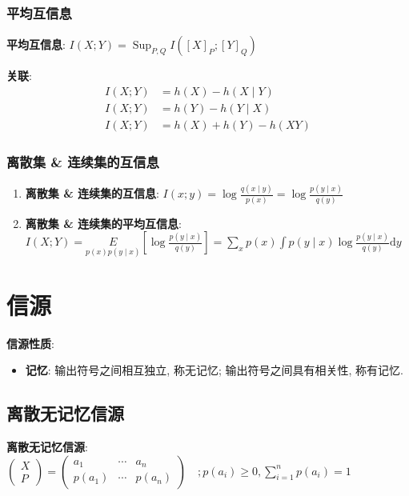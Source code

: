 \documentclass{article}
\begin{document}
        \subsubsection{平均互信息}
            \textbf{平均互信息}: $I(X ; Y)=\operatorname{Sup}_{P, Q} I\left([X]_{P} ;[Y]_{Q}\right)$
            
            \textbf{关联}:
                \begin{align*}
                    I(X ; Y) &= h(X)-h(X \mid Y) \\
                    I(X ; Y) &= h(Y)-h(Y \mid X) \\
                    I(X ; Y) &= h(X)+h(Y)-h(X Y)
                \end{align*}
                
        \subsubsection{离散集 \& 连续集的互信息}
            \begin{enumerate}
                \item \textbf{离散集 \& 连续集的互信息}: $I(x ; y)=\log \frac{q(x \mid y)}{p(x)}=\log \frac{p(y \mid x)}{q(y)}$
                \item \textbf{离散集 \& 连续集的平均互信息}: $I(X ; Y)=\underset{p(x) p(y \mid x)}{E}\left[\log \frac{p(y \mid x)}{q(y)}\right]=\sum_{x} p(x) \int p(y \mid x) \log \frac{p(y \mid x)}{q(y)} \mathrm{d} y$
            \end{enumerate}
            
            
\section{信源}

    \textbf{信源性质}:
        \begin{itemize}
            \item \textbf{记忆}: 输出符号之间相互独立, 称无记忆; 输出符号之间具有相关性, 称有记忆.
        \end{itemize}
    
    \subsection{离散无记忆信源}
        \textbf{离散无记忆信源}:  $ \left(\begin{array}{l} X \\ P \end{array}\right)
                 = \left(\begin{array}{lll}
                    a_{1} & \cdots & a_{n} \\ p\left(a_{1}\right) & \cdots & p\left(a_{n}\right)
                \end{array}\right) \quad;
                p\left(a_{i}\right) \geqslant 0, \sum_{i=1}^{n} p\left(a_{i}\right)=1$
                
\end{document}
